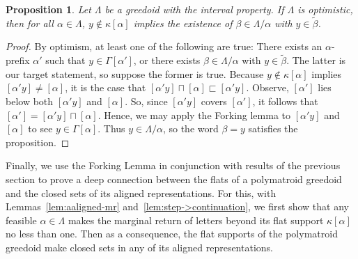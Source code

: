 \documentclass[11pt]{article}
\newtheorem{proposition}[theorem]{Proposition}
\newcommand{\glang}{\Lambda}
\begin{document}
\begin{proposition}\label{prop:strong-opt}
    Let $\glang$ be a greedoid with the interval property.
    If $\glang$ is optimistic, then for all $\alpha \in \glang$, $y \notin \kappa[\alpha]$ implies the existence of $\beta \in \glang/\alpha$ with $y\in \widetilde{\beta}$.
\end{proposition}
\begin{proof}
    By optimism, at least one of the following are true:
    There exists an $\alpha$-prefix $\alpha'$ such that $y \in \Gamma[\alpha']$, or there exists $\beta\in\glang/\alpha$ with $y \in \widetilde{\beta}$.
    The latter is our target statement, so suppose the former is true.
    Because $y \notin \kappa[\alpha]$ implies $[\alpha'y] \neq [\alpha]$, it is the case that $[\alpha'y]\sqcap [\alpha] \sqsubset [\alpha'y]$.
    Observe, $[\alpha']$ lies below both $[\alpha'y]$ and $[\alpha]$.
    So, since $[\alpha'y]$ covers $[\alpha']$, it follows that $[\alpha'] = [\alpha' y] \sqcap [\alpha]$.
    Hence, we may apply the Forking lemma to $[\alpha'y]$ and $[\alpha]$ to see $y \in \Gamma[\alpha]$.
    Thus $y\in\glang/\alpha$, so the word $\beta = y$ satisfies the proposition.
\end{proof}


\iffalse
Finally, we use the Forking Lemma in conjunction with results of the previous section to prove a deep connection between the flats of a polymatroid greedoid and the closed sets of its aligned representations.
For this, with Lemmas~\ref{lem:aaligned-mr} and~\ref{lem:step->continuation}, we first show that any feasible $\alpha \in \glang$ makes the marginal return of letters beyond its flat support $\kappa[\alpha]$ no less than one.
Then as a consequence, the flat supports of the polymatroid greedoid make closed sets in any of its aligned representations.
\end{document}
